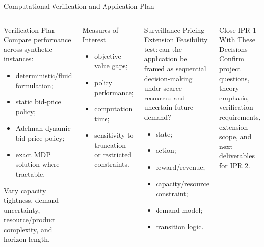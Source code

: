 \documentclass[aspectratio=169,9pt]{beamer}
\begin{document}
\begin{frame}[t]{Computational Verification and Application Plan}
\footnotesize
\begin{columns}[T,onlytextwidth]
\begin{block}{Verification Plan}
Compare performance across synthetic instances:
\begin{itemize}
    \item deterministic/fluid formulation;
    \item static bid-price policy;
    \item Adelman dynamic bid-price policy;
    \item exact MDP solution where tractable.
\end{itemize}
Vary capacity tightness, demand uncertainty, resource/product complexity, and horizon length.
\end{block}

\begin{block}{Measures of Interest}
\begin{itemize}
    \item objective-value gaps;
    \item policy performance;
    \item computation time;
    \item sensitivity to truncation or restricted constraints.
\end{itemize}
\end{block}

\begin{block}{Surveillance-Pricing Extension}
Feasibility test: can the application be framed as sequential decision-making under scarce resources and uncertain future demand?
\begin{itemize}
    \item state;
    \item action;
    \item reward/revenue;
    \item capacity/resource constraint;
    \item demand model;
    \item transition logic.
\end{itemize}
\end{block}

\begin{block}{Close IPR 1 With These Decisions}
Confirm project questions, theory emphasis, verification requirements, extension scope, and next deliverables for IPR 2.
\end{block}
\end{columns}
\end{frame}
\end{document}
